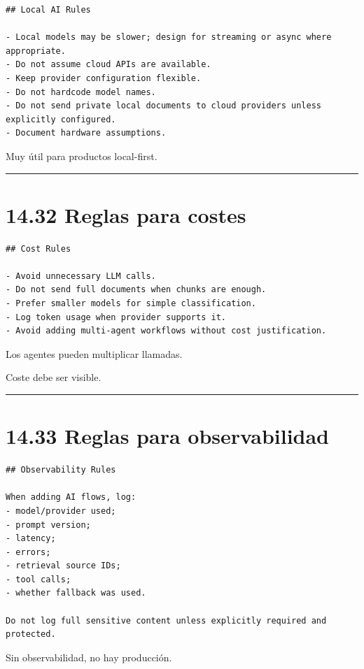 \begin{lstlisting}
## Local AI Rules

- Local models may be slower; design for streaming or async where appropriate.
- Do not assume cloud APIs are available.
- Keep provider configuration flexible.
- Do not hardcode model names.
- Do not send private local documents to cloud providers unless explicitly configured.
- Document hardware assumptions.
\end{lstlisting}

Muy útil para productos local-first.

\begin{center}\rule{0.5\linewidth}{0.5pt}\end{center}

\section{14.32 Reglas para costes}\label{reglas-para-costes}

\begin{lstlisting}
## Cost Rules

- Avoid unnecessary LLM calls.
- Do not send full documents when chunks are enough.
- Prefer smaller models for simple classification.
- Log token usage when provider supports it.
- Avoid adding multi-agent workflows without cost justification.
\end{lstlisting}

Los agentes pueden multiplicar llamadas.

Coste debe ser visible.

\begin{center}\rule{0.5\linewidth}{0.5pt}\end{center}

\section{14.33 Reglas para
observabilidad}\label{reglas-para-observabilidad}

\begin{lstlisting}
## Observability Rules

When adding AI flows, log:
- model/provider used;
- prompt version;
- latency;
- errors;
- retrieval source IDs;
- tool calls;
- whether fallback was used.

Do not log full sensitive content unless explicitly required and protected.
\end{lstlisting}

Sin observabilidad, no hay producción.

